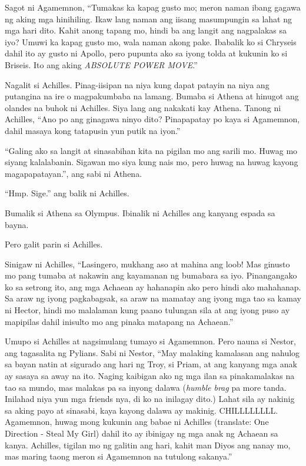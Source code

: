 \documentclass[12pt,letterpaper]{report}
\begin{document}
Sagot ni Agamemnon, ``Tumakas ka kapag gusto mo; meron naman ibang gagawa ng aking mga hinihiling. Ikaw lang naman ang iisang masumpungin sa lahat ng mga hari dito. Kahit anong tapang mo, hindi ba ang langit ang nagpalakas sa iyo? Umuwi ka kapag gusto mo, wala naman akong pake. Ibabalik ko si Chryseis dahil ito ay gusto ni Apollo, pero pupunta ako sa iyong tolda at kukunin ko si Briseis. Ito ang aking \textit{ABSOLUTE POWER MOVE}.''

Nagalit si Achilles. Pinag-iisipan na niya kung dapat patayin na niya ang putangina na ire o magpakumbaba na lamang. Bumaba si Athena at hinugot ang olandes na buhok ni Achilles. Siya lang ang nakakati kay Athena. Tanong ni Achilles, ``Ano po ang ginagawa ninyo dito? Pinapapatay po kaya si Agamemnon, dahil masaya kong tatapusin yun putik na iyon.''

``Galing ako sa langit at sinasabihan kita na pigilan mo ang sarili mo. Huwag mo siyang kalalabanin. Sigawan mo siya kung nais mo, pero huwag na huwag kayong magapapatayan.'', ang sabi ni Athena.

``Hmp. Sige.'' ang balik ni Achilles.

Bumalik si Athena sa Olympus. Ibinalik ni Achilles ang kanyang espada sa bayna.

Pero galit parin si Achilles.

Sinigaw ni Achilles, ``Lasingero, mukhang aso at mahina ang loob! Mas ginusto mo pang tumaba at nakawin ang kayamanan ng bumabara sa iyo. Pinangangako ko sa setrong ito, ang mga Achaean ay hahanapin ako pero hindi ako mahahanap. Sa araw ng iyong pagkabagsak, sa araw na mamatay ang iyong mga tao sa kamay ni Hector, hindi mo malalaman kung paano tulungan sila at ang iyong puso ay mapipilas dahil inisulto mo ang pinaka matapang na Achaean.''

Umupo si Achilles at nagsimulang tumayo si Agamemnon. Pero nauna si Nestor, ang tagasalita ng Pylians. Sabi ni Nestor, ``May malaking kamalasan ang nahulog sa bayan natin at sigurado ang hari ng Troy, si Priam, at ang kanyang mga anak ay sasaya sa away na ito. Naging kaibigan ako ng mga ilan sa pinakamalakas na tao sa mundo, mas malakas pa sa inyong dalawa (\textit{humble brag} pa more tanda. Inilahad niya yun mga friends nya, di ko na inilagay dito.) Lahat sila ay nakinig sa aking payo at sinasabi, kaya kayong dalawa ay makinig. CHILLLLLLLL. Agamemnon, huwag mong kukunin ang babae ni Achilles (translate: One Direction - Steal My Girl) dahil ito ay ibinigay ng mga anak ng Achaean sa kanya. Achilles, tigilan mo ng galitin ang hari, kahit man Diyos ang nanay mo, mas maring taong meron si Agamemnon na tutulong sakanya.''
\end{document}
